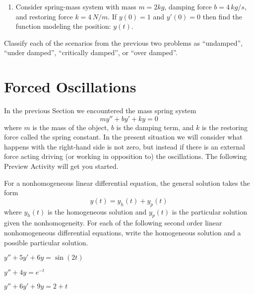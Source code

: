 \begin{problem}
\begin{enumerate}
    \item Consider spring-mass system with mass $m=2kg$, damping force $b=4\, kg/s$, and
        restoring force $k=4\,N/m$.  If $y(0)=1$ and $y'(0)=0$ then find the function
        modeling the position: $y(t)$. 
        \\
\end{enumerate}
\end{problem}


\begin{problem}
    Classify each of the scenarios from the previous two problems as ``undamped'', ``under
    damped'', ``critically damped'', or ``over damped''.
\end{problem}


\newpage\section{Forced Oscillations}
In the previous Section we encountered the mass spring system 
\[ my'' + by' + ky = 0 \]
where $m$ is the mass of the object, $b$ is the damping term, and $k$ is the restoring
force called the spring constant.  In the present situation we will consider what happens
with the right-hand side is not zero, but instead if there is an external force acting
driving (or working in opposition to) the oscillations.  The following Preview Activity
will get you started.

% 
\begin{problem}
    For a nonhomogeneous linear differential equation, the general solution takes the form
    \[ y(t) = y_h(t) + y_p(t) \]
    where $y_h(t)$ is the homogeneous solution and $y_p(t)$ is the particular solution
    given the nonhomogeneity.  For each of the following second
    order linear nonhomogeneous differential equations, write the homogeneous solution
    and a possible particular solution.
    \ba
        \item $y''+5y'+6y=\sin(2t)$
        \item $y''+4y=e^{-t}$
        \item $y''+6y'+9y=2+t$
    \ea
\end{problem}

